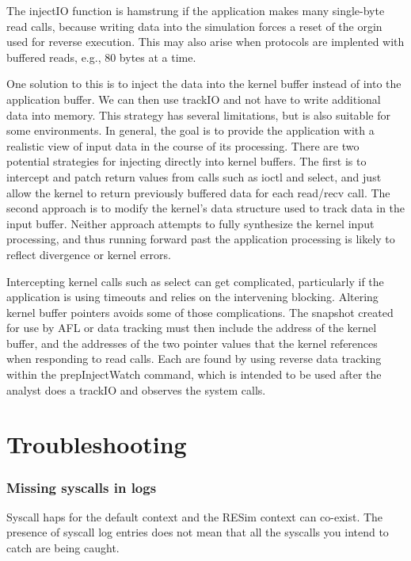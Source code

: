 \documentclass[titlepage]{article}
\begin{document}
\begin{appendices}
The injectIO function is hamstrung if the application makes many single-byte read calls, because writing data into the
simulation forces a reset of the orgin used for reverse execution.  This may also arise when protocols are implented
with buffered reads, e.g., 80 bytes at a time.

One solution to this is to inject the data into the kernel buffer instead of into the application buffer.
We can then use trackIO and not have to write additional data into memory.  This strategy has several limitations, but
is also suitable for some environments.  In general, the goal is to provide the application with a realistic view of
input data in the course of its processing.  There are two potential strategies for injecting directly into kernel buffers.
The first is to intercept and patch return values from calls such as ioctl and select, and just allow the kernel to 
return previously buffered data for each read/recv call.  The second approach is to modify the kernel's data structure
used to track data in the input buffer.  Neither approach attempts to fully synthesize the kernel input processing, and thus
running forward past the application processing is likely to reflect divergence or kernel errors.

Intercepting kernel calls such as select can get complicated, particularly if the application is using timeouts and relies
on the intervening blocking.  Altering kernel buffer pointers avoids some of those complications.  The snapshot created
for use by AFL or data tracking must then include the address of the kernel buffer, and the addresses of the two pointer
values that the kernel references when responding to read calls.  Each are found by using reverse data tracking within the
prepInjectWatch command, which is intended to be used after the analyst does a trackIO and observes the system calls.


\section{Troubleshooting}
\subsubsection{Missing syscalls in logs}
Syscall haps for the default context and the RESim context can co-exist.  The presence of syscall log entries does not
mean that all the syscalls you intend to catch are being caught.


\end{appendices}
\end{document}

